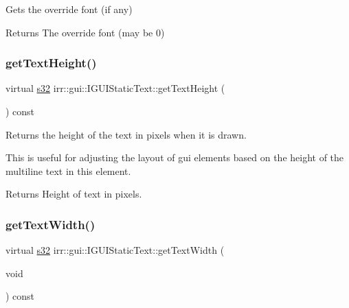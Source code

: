 Gets the override font (if any) 

\begin{DoxyReturn}{Returns}
The override font (may be 0) 
\end{DoxyReturn}
\mbox{\label{classirr_1_1gui_1_1IGUIStaticText_a88e90c238601f17e1f0b0d79c7dc1004}} 
\subsubsection{\texorpdfstring{get\+Text\+Height()}{getTextHeight()}}
{\footnotesize\ttfamily virtual \hyperlink{namespaceirr_ac66849b7a6ed16e30ebede579f9b47c6}{s32} irr\+::gui\+::\+I\+G\+U\+I\+Static\+Text\+::get\+Text\+Height (\begin{DoxyParamCaption}{ }\end{DoxyParamCaption}) const\hspace{0.3cm}{\ttfamily [pure virtual]}}



Returns the height of the text in pixels when it is drawn. 

This is useful for adjusting the layout of gui elements based on the height of the multiline text in this element. \begin{DoxyReturn}{Returns}
Height of text in pixels. 
\end{DoxyReturn}
\mbox{\label{classirr_1_1gui_1_1IGUIStaticText_adcfbe869b6c0ab409bbde51d4cba7e5d}} 
\subsubsection{\texorpdfstring{get\+Text\+Width()}{getTextWidth()}}
{\footnotesize\ttfamily virtual \hyperlink{namespaceirr_ac66849b7a6ed16e30ebede579f9b47c6}{s32} irr\+::gui\+::\+I\+G\+U\+I\+Static\+Text\+::get\+Text\+Width (\begin{DoxyParamCaption}\item[{void}]{ }\end{DoxyParamCaption}) const\hspace{0.3cm}{\ttfamily [pure virtual]}}



